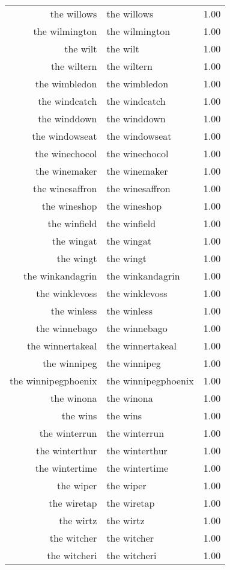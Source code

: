 \begin{table}[ht]
\begin{tabular}{rlr}
  the willows & the willows & 1.00 \\ 
  the wilmington & the wilmington & 1.00 \\ 
  the wilt & the wilt & 1.00 \\ 
  the wiltern & the wiltern & 1.00 \\ 
  the wimbledon & the wimbledon & 1.00 \\ 
  the windcatch & the windcatch & 1.00 \\ 
  the winddown & the winddown & 1.00 \\ 
  the windowseat & the windowseat & 1.00 \\ 
  the winechocol & the winechocol & 1.00 \\ 
  the winemaker & the winemaker & 1.00 \\ 
  the winesaffron & the winesaffron & 1.00 \\ 
  the wineshop & the wineshop & 1.00 \\ 
  the winfield & the winfield & 1.00 \\ 
  the wingat & the wingat & 1.00 \\ 
  the wingt & the wingt & 1.00 \\ 
  the winkandagrin & the winkandagrin & 1.00 \\ 
  the winklevoss & the winklevoss & 1.00 \\ 
  the winless & the winless & 1.00 \\ 
  the winnebago & the winnebago & 1.00 \\ 
  the winnertakeal & the winnertakeal & 1.00 \\ 
  the winnipeg & the winnipeg & 1.00 \\ 
  the winnipegphoenix & the winnipegphoenix & 1.00 \\ 
  the winona & the winona & 1.00 \\ 
  the wins & the wins & 1.00 \\ 
  the winterrun & the winterrun & 1.00 \\ 
  the winterthur & the winterthur & 1.00 \\ 
  the wintertime & the wintertime & 1.00 \\ 
  the wiper & the wiper & 1.00 \\ 
  the wiretap & the wiretap & 1.00 \\ 
  the wirtz & the wirtz & 1.00 \\ 
  the witcher & the witcher & 1.00 \\ 
  the witcheri & the witcheri & 1.00 \\ 

\end{tabular}
\end{table}
